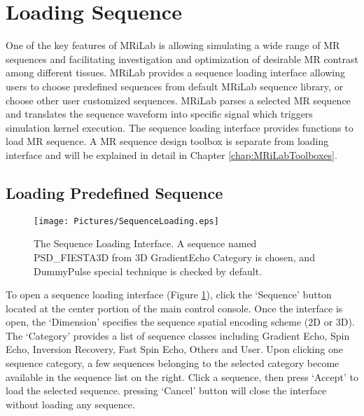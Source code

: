 \documentclass{book}%
\begin{document}
\section{Loading Sequence}
One of the key features of MRiLab is allowing simulating a wide range of MR sequences and facilitating investigation and optimization of desirable MR contrast among different tissues. MRiLab provides a sequence loading interface allowing users to choose predefined sequences from default MRiLab sequence library, or choose other user customized sequences. MRiLab parses a selected MR sequence and translates the sequence waveform into specific signal which triggers simulation kernel execution. The sequence loading interface provides functions to load MR sequence. A MR sequence design toolbox is separate from loading interface and will be explained in detail in Chapter \ref{chap:MRiLabToolboxes}.

\subsection{Loading Predefined Sequence}

\begin{figure}[htbp]
	\centering
		\texttt{[image: Pictures/SequenceLoading.eps]}
	\caption{The Sequence Loading Interface. A sequence named PSD\_FIESTA3D from 3D GradientEcho Category is chosen, and DummyPulse special technique is checked by default.}
	\label{fig:SequenceLoading}
\end{figure}

To open a sequence loading interface (Figure \ref{fig:SequenceLoading}), click the `Sequence' button located at the center portion of the main control console. Once the interface is open, the `Dimension' specifies the sequence spatial encoding scheme (2D or 3D). The `Category' provides a list of sequence classes including Gradient Echo, Spin Echo, Inversion Recovery, Fast Spin Echo, Others and User. Upon clicking one sequence category, a few sequences belonging to the selected category become available in the sequence list on the right. Click a sequence, then press `Accept' to load the selected sequence. pressing `Cancel' button will close the interface without loading any sequence. \\
\end{document}
